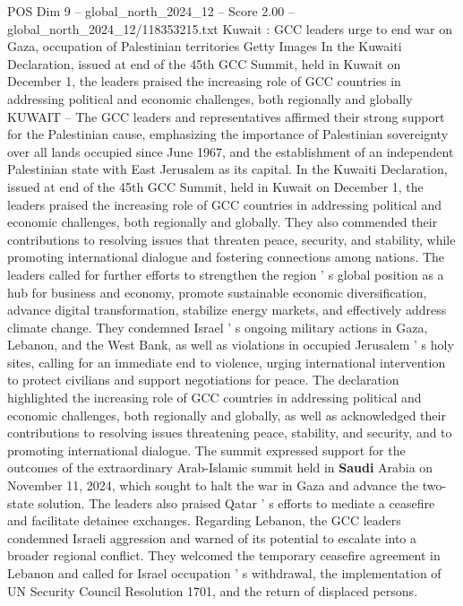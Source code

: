 \begin{textsample}{POS Dim 9 – global\_north\_2024\_12 – Score 2.00 – global\_north\_2024\_12/118353215.txt}  \label{ex:f9_pos_326}
Kuwait : GCC leaders urge to end war on Gaza, occupation of Palestinian territories Getty Images In the Kuwaiti Declaration, issued at end of the 45th GCC Summit, held in Kuwait on December 1, the leaders praised the increasing role of GCC countries in addressing political and economic challenges, both regionally and globally KUWAIT -- The GCC leaders and representatives affirmed their strong support for the Palestinian cause, emphasizing the importance of Palestinian sovereignty over all lands occupied since June 1967, and the establishment of an independent Palestinian state with East Jerusalem as its capital.
In the Kuwaiti Declaration, issued at end of the 45th GCC Summit, held in Kuwait on December 1, the leaders praised the increasing role of GCC countries in addressing political and economic challenges, both regionally and globally.
They also commended their contributions to resolving issues that threaten peace, security, and stability, while promoting international dialogue and fostering connections among nations.
The leaders called for further efforts to strengthen the region ' s global position as a hub for business and economy, promote sustainable economic diversification, advance digital transformation, stabilize energy markets, and effectively address climate change.
They condemned Israel ' s ongoing military actions in Gaza, Lebanon, and the West Bank, as well as violations in occupied Jerusalem ' s holy sites, calling for an immediate end to violence, urging international intervention to protect civilians and support negotiations for peace.
The declaration highlighted the increasing role of GCC countries in addressing political and economic challenges, both regionally and globally, as well as acknowledged their contributions to resolving issues threatening peace, stability, and security, and to promoting international dialogue.
The summit expressed support for the outcomes of the extraordinary Arab-Islamic summit held in \textbf{Saudi} Arabia on November 11, 2024, which sought to halt the war in Gaza and advance the two-state solution.
The leaders also praised Qatar ' s efforts to mediate a ceasefire and facilitate detainee exchanges.
Regarding Lebanon, the GCC leaders condemned Israeli aggression and warned of its potential to escalate into a broader regional conflict.
They welcomed the temporary ceasefire agreement in Lebanon and called for Israel occupation ' s withdrawal, the implementation of UN Security Council Resolution 1701, and the return of displaced persons.

\end{textsample}
